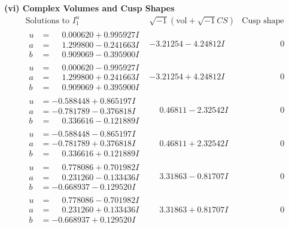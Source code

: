\documentclass[1p]{elsarticle_modified}
\theoremstyle{definition}
\newcommand{\I}{\sqrt{-1}}
\begin{document}
\newpage\flushleft \textbf{(vi) Complex Volumes and Cusp Shapes}
$$\begin{array}{c|c|c}  
\text{Solutions to }I^u_{1}& \I (\text{vol} + \sqrt{-1}CS) & \text{Cusp shape}\\
 \hline 
\begin{aligned}
u &= \phantom{-}0.000620 + 0.995927 I \\
a &= \phantom{-}1.299800 - 0.241663 I \\
b &= \phantom{-}0.909069 - 0.395900 I\end{aligned}
 & -3.21254 - 4.24812 I & \phantom{-0.000000 } 0 \\ \hline\begin{aligned}
u &= \phantom{-}0.000620 - 0.995927 I \\
a &= \phantom{-}1.299800 + 0.241663 I \\
b &= \phantom{-}0.909069 + 0.395900 I\end{aligned}
 & -3.21254 + 4.24812 I & \phantom{-0.000000 } 0 \\ \hline\begin{aligned}
u &= -0.588448 + 0.865197 I \\
a &= -0.781789 - 0.376818 I \\
b &= \phantom{-}0.336616 - 0.121889 I\end{aligned}
 & \phantom{-}0.46811 - 2.32542 I & \phantom{-0.000000 } 0 \\ \hline\begin{aligned}
u &= -0.588448 - 0.865197 I \\
a &= -0.781789 + 0.376818 I \\
b &= \phantom{-}0.336616 + 0.121889 I\end{aligned}
 & \phantom{-}0.46811 + 2.32542 I & \phantom{-0.000000 } 0 \\ \hline\begin{aligned}
u &= \phantom{-}0.778086 + 0.701982 I \\
a &= \phantom{-}0.231260 - 0.133436 I \\
b &= -0.668937 - 0.129520 I\end{aligned}
 & \phantom{-}3.31863 - 0.81707 I & \phantom{-0.000000 } 0 \\ \hline\begin{aligned}
u &= \phantom{-}0.778086 - 0.701982 I \\
a &= \phantom{-}0.231260 + 0.133436 I \\
b &= -0.668937 + 0.129520 I\end{aligned}
 & \phantom{-}3.31863 + 0.81707 I & \phantom{-0.000000 } 0 \\ \hline\begin{aligned}

\end{aligned}
\end{array}$$
\end{document}
